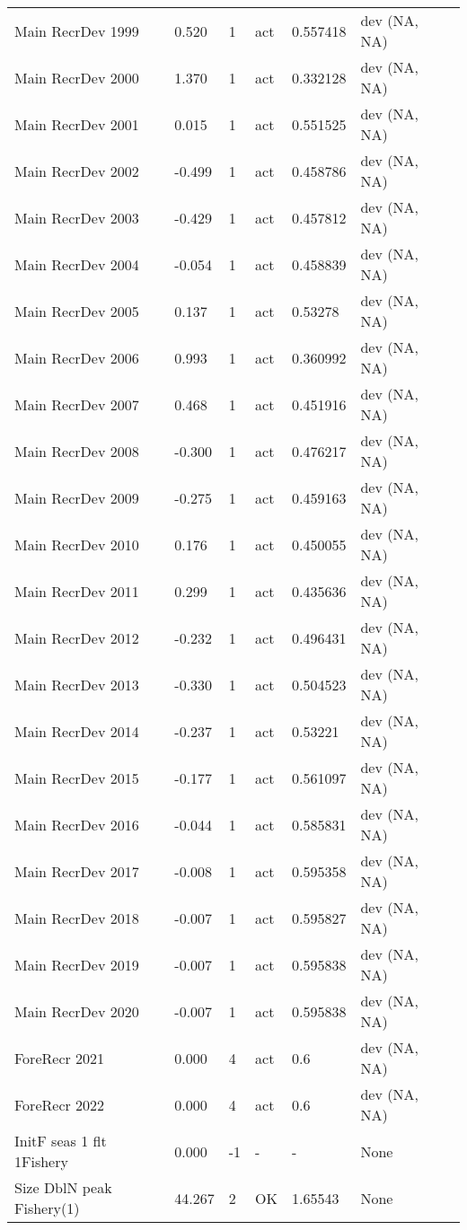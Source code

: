 \documentclass[11pt,
  english,
  a4paper,
]{article}
\begin{document}
\begin{landscape}
\begin{longtable}[t]{>{\raggedright\arraybackslash}p{6cm}lllll>{\raggedright\arraybackslash}p{4cm}}
Main RecrDev 1999 & 0.520 & 1 & act & 0.557418 & dev (NA, NA)\\
Main RecrDev 2000 & 1.370 & 1 & act & 0.332128 & dev (NA, NA)\\
Main RecrDev 2001 & 0.015 & 1 & act & 0.551525 & dev (NA, NA)\\
Main RecrDev 2002 & -0.499 & 1 & act & 0.458786 & dev (NA, NA)\\
Main RecrDev 2003 & -0.429 & 1 & act & 0.457812 & dev (NA, NA)\\
Main RecrDev 2004 & -0.054 & 1 & act & 0.458839 & dev (NA, NA)\\
Main RecrDev 2005 & 0.137 & 1 & act & 0.53278 & dev (NA, NA)\\
Main RecrDev 2006 & 0.993 & 1 & act & 0.360992 & dev (NA, NA)\\
Main RecrDev 2007 & 0.468 & 1 & act & 0.451916 & dev (NA, NA)\\
Main RecrDev 2008 & -0.300 & 1 & act & 0.476217 & dev (NA, NA)\\
Main RecrDev 2009 & -0.275 & 1 & act & 0.459163 & dev (NA, NA)\\
Main RecrDev 2010 & 0.176 & 1 & act & 0.450055 & dev (NA, NA)\\
Main RecrDev 2011 & 0.299 & 1 & act & 0.435636 & dev (NA, NA)\\
Main RecrDev 2012 & -0.232 & 1 & act & 0.496431 & dev (NA, NA)\\
Main RecrDev 2013 & -0.330 & 1 & act & 0.504523 & dev (NA, NA)\\
Main RecrDev 2014 & -0.237 & 1 & act & 0.53221 & dev (NA, NA)\\
Main RecrDev 2015 & -0.177 & 1 & act & 0.561097 & dev (NA, NA)\\
Main RecrDev 2016 & -0.044 & 1 & act & 0.585831 & dev (NA, NA)\\
Main RecrDev 2017 & -0.008 & 1 & act & 0.595358 & dev (NA, NA)\\
Main RecrDev 2018 & -0.007 & 1 & act & 0.595827 & dev (NA, NA)\\
Main RecrDev 2019 & -0.007 & 1 & act & 0.595838 & dev (NA, NA)\\
Main RecrDev 2020 & -0.007 & 1 & act & 0.595838 & dev (NA, NA)\\
ForeRecr 2021 & 0.000 & 4 & act & 0.6 & dev (NA, NA)\\
ForeRecr 2022 & 0.000 & 4 & act & 0.6 & dev (NA, NA)\\
InitF seas 1 flt 1Fishery & 0.000 & -1 & - & - & None\\
Size DblN peak Fishery(1) & 44.267 & 2 & OK & 1.65543 & None\\

\end{longtable}
\end{landscape}
\end{document}
